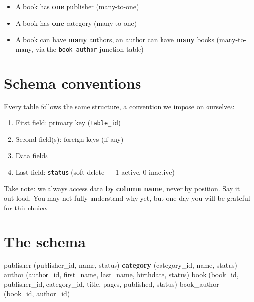 \documentclass[11pt,a4paper,oneside]{book}
\newenvironment{Shaded}{\begin{snugshade}}{\end{snugshade}}
\newcommand{\KeywordTok}[1]{\textcolor[HTML]{007020}{\textbf{#1}}}
\newcommand{\NormalTok}[1]{#1}
\providecommand{\tightlist}{%
  \setlength{\itemsep}{0pt}\setlength{\parskip}{0pt}}
\begin{document}
\begin{itemize}
\tightlist
\item
  A book has \textbf{one} publisher (many-to-one)
\item
  A book has \textbf{one} category (many-to-one)
\item
  A book can have \textbf{many} authors, an author can have
  \textbf{many} books (many-to-many, via the
  \texttt{book\_author} junction table)
\end{itemize}

\hypertarget{schema-conventions}{%
\section{Schema conventions}\label{schema-conventions}}

Every table follows the same structure, a convention we impose on
ourselves:

\begin{enumerate}
\def\labelenumi{\arabic{enumi}.}
\tightlist
\item
  First field: primary key (\texttt{table\_id})
\item
  Second field(s): foreign keys (if any)
\item
  Data fields
\item
  Last field: \texttt{status} (soft delete --- 1 active, 0
  inactive)
\end{enumerate}

Take note: we always access data \textbf{by column name}, never
by position. Say it out loud. You may not fully understand why
yet, but one day you will be grateful for this choice.

\hypertarget{the-schema}{%
\section{The schema}\label{the-schema}}

\begin{Shaded}
\begin{Highlighting}[]
\NormalTok{publisher (publisher\_id, name, status)}
\KeywordTok{category}\NormalTok{  (category\_id, name, status)}
\NormalTok{author    (author\_id, first\_name, last\_name, birthdate, status)}
\NormalTok{book      (book\_id, publisher\_id, category\_id, title, pages, published, status)}
\NormalTok{book\_author (book\_id, author\_id)}
\end{Highlighting}
\end{Shaded}
\end{document}
